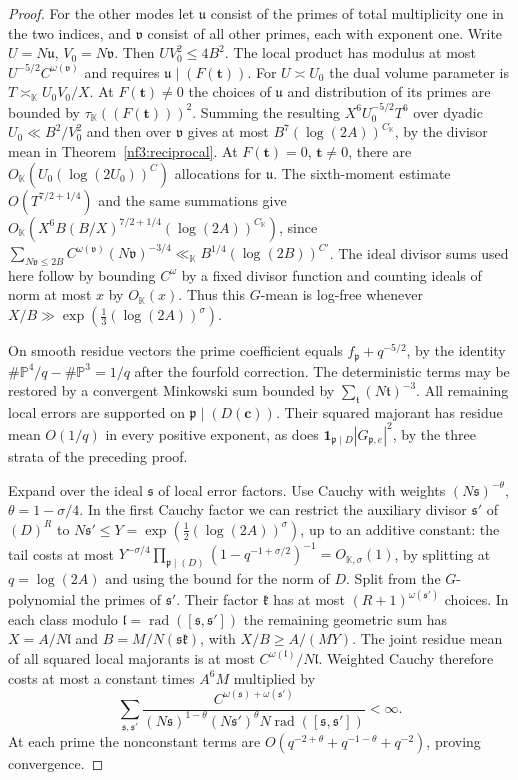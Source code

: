 \documentclass[11pt,letterpaper]{article}
\theoremstyle{definition}
\numberwithin{equation}{section}
\begin{document}
\begin{proof}
For the other modes let $\mathfrak u$ consist of the primes of total
multiplicity one in the two indices, and $\mathfrak v$ consist
of all other primes, each with exponent one. Write
$U=N\mathfrak u$, $V_0=N\mathfrak v$. Then $U V_0^2\le4B^2$.
The local product has modulus at most
$U^{-5/2}C^{\omega(\mathfrak v)}$ and requires
$\mathfrak u\mid(F(\mathbf t))$. For $U\asymp U_0$ the dual volume
parameter is $T\asymp_{\mathbb K}U_0 V_0/X$. At $F(\mathbf t)\ne0$
the choices of $\mathfrak u$ and distribution of its primes
are bounded by $\tau_{\mathbb K}((F(\mathbf t)))^2$. Summing the
resulting $X^6 U_0^{-5/2}T^6$ over dyadic $U_0\ll B^2/V_0^2$ and
then over $\mathfrak v$ gives at most $B^7(\log(2A))^{C_{\mathbb K}}$,
by the divisor mean in Theorem~\ref{nf3:reciprocal}. At
$F(\mathbf t)=0$, $\mathbf t\ne0$, there are
$O_{\mathbb K}(U_0(\log(2U_0))^C)$ allocations for $\mathfrak u$.
The sixth-moment estimate $O(T^{7/2+1/4})$ and the same summations
give $O_{\mathbb K}(X^6B(B/X)^{7/2+1/4}(\log(2A))^{C_{\mathbb K}})$,
since $\sum_{N\mathfrak v\le2B}C^{\omega(\mathfrak v)}
(N\mathfrak v)^{-3/4}\ll_{\mathbb K} B^{1/4}(\log(2B))^{C'}$.
The ideal divisor sums used here follow by bounding $C^{\omega}$
by a fixed divisor function and counting ideals of norm at most
$x$ by $O_{\mathbb K}(x)$. Thus this $G$-mean is log-free whenever
$X/B\gg\exp(\tfrac13(\log(2A))^\sigma)$.

On smooth residue vectors the prime coefficient equals
$f_{\mathfrak p}+q^{-5/2}$, by the identity
$\#\mathbb P^4/q-\#\mathbb P^3=1/q$ after the fourfold correction.
The deterministic terms may be restored by a convergent Minkowski
sum bounded by $\sum_{\mathfrak t}(N\mathfrak t)^{-3}$. All
remaining local errors are supported on $\mathfrak p\mid(D(\mathbf c))$.
Their squared majorant has residue mean $O(1/q)$ in every positive
exponent, as does $\mathbf1_{\mathfrak p\mid D}|G_{\mathfrak p,e}|^2$,
by the three strata of the preceding proof.

Expand over the ideal $\mathfrak s$ of local error factors.
Use Cauchy with weights $(N\mathfrak s)^{-\theta}$,
$\theta=1-\sigma/4$. In the first Cauchy factor we can restrict
the auxiliary divisor $\mathfrak s'$ of $(D)^R$ to
$N\mathfrak s'\le Y=\exp(\tfrac12(\log(2A))^\sigma)$, up to an
additive constant: the tail costs at most
$Y^{-\sigma/4}\prod_{\mathfrak p\mid(D)}
(1-q^{-1+\sigma/2})^{-1}=O_{\mathbb K,\sigma}(1)$, by splitting
at $q=\log(2A)$ and using the bound for the norm of $D$.
Split from the $G$-polynomial the primes of $\mathfrak s'$.
Their factor $\mathfrak k$ has at most
$(R+1)^{\omega(\mathfrak s')}$ choices. In each class modulo
$\mathfrak l=\operatorname{rad}([\mathfrak s,\mathfrak s'])$
the remaining geometric sum has $X=A/N\mathfrak l$ and
$B=M/N(\mathfrak s\mathfrak k)$, with $X/B\ge A/(MY)$.
The joint residue mean of all squared local majorants is at most
$C^{\omega(\mathfrak l)}/N\mathfrak l$. Weighted Cauchy
therefore costs at most a constant times $A^6M$ multiplied by
\[
 \sum_{\mathfrak s,\mathfrak s'}
 \frac{C^{\omega(\mathfrak s)+\omega(\mathfrak s')}}{
 (N\mathfrak s)^{1-\theta}(N\mathfrak s')^\theta
 N\operatorname{rad}([\mathfrak s,\mathfrak s'])}<\infty .
\]
At each prime the nonconstant terms are
$O(q^{-2+\theta}+q^{-1-\theta}+q^{-2})$, proving convergence.


\end{proof}
\end{document}
